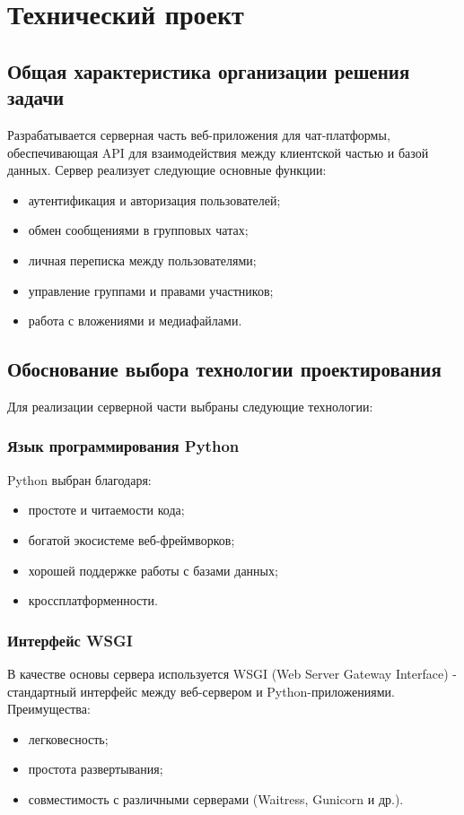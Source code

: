 \section{Технический проект}
\subsection{Общая характеристика организации решения задачи}

Разрабатывается серверная часть веб-приложения для чат-платформы, обеспечивающая API для взаимодействия между клиентской частью и базой данных. Сервер реализует следующие основные функции:
\begin{itemize}
	\item аутентификация и авторизация пользователей;
	\item обмен сообщениями в групповых чатах;
	\item личная переписка между пользователями;
	\item управление группами и правами участников;
	\item работа с вложениями и медиафайлами.
\end{itemize}

\subsection{Обоснование выбора технологии проектирования}

Для реализации серверной части выбраны следующие технологии:

\subsubsection{Язык программирования Python}

Python выбран благодаря:
\begin{itemize}
	\item простоте и читаемости кода;
	\item богатой экосистеме веб-фреймворков;
	\item хорошей поддержке работы с базами данных;
	\item кроссплатформенности.
\end{itemize}

\subsubsection{Интерфейс WSGI}

В качестве основы сервера используется WSGI (Web Server Gateway Interface) - стандартный интерфейс между веб-сервером и Python-приложениями. Преимущества:
\begin{itemize}
	\item легковесность;
	\item простота развертывания;
	\item совместимость с различными серверами (Waitress, Gunicorn и др.).
\end{itemize}

